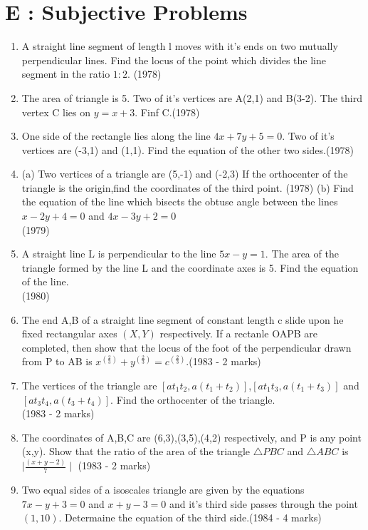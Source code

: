 \documentclass[12pt]{article}
\begin{document}
\section*{E  :  Subjective Problems}

\begin{enumerate}
\item  A straight line segment of length l moves with it's ends on two mutually perpendicular lines. Find the locus of the point which divides the line segment in the ratio $1:2$. (1978)
\item The area of triangle is 5. Two of it's vertices are A(2,1) and B(3-2). The third vertex C lies on $y=x+3$. Finf C.(1978)
\item One side of the rectangle lies along the line $4x+7y+5=0$. Two of it's vertices are (-3,1) and (1,1). Find the equation of the other two sides.(1978)
\item(a) Two vertices of a triangle are (5,-1) and (-2,3) If the orthocenter of the triangle is the origin,find the coordinates of the third point. (1978)
(b) Find the equation of the line which bisects the obtuse angle between the lines $x-2y+4=0$ and $4x-3y+2=0$\\ (1979)
\item  A straight line L is perpendicular to the line $5x-y=1$. The area of the triangle formed by the line L and the coordinate axes is 5. Find the equation of the line.\\ (1980)
\item The end A,B of a straight line segment of constant length c slide upon he fixed rectangular axes $(X,Y)$ respectively. If a rectanle OAPB are completed, then show that the locus of the foot of the perpendicular drawn from P to AB is $x^(\frac{2}{3})+y^(\frac{2}{3})=c^(\frac{2}{3})$.(1983 - 2 marks)\\
\item The vertices of the triangle are $[at_1t_2,a(t_1+t_2)]$,$[at_1t_3,a(t_1+t_3)]$ and $[at_3t_4,a(t_3+t_4)]$. Find the orthocenter of the triangle.\\ (1983 - 2 marks)
\item The coordinates of A,B,C are  (6,3),(3,5),(4,2) respectively, and P is any point (x,y). Show that the ratio of the area of the triangle $\triangle PBC$ and $\triangle ABC $ is $\mid\frac{(x+y-2)}{7}\mid$ (1983 - 2 marks)\\
\item Two equal sides of a isoscales triangle are given by the equations $7x-y+3=0$ and $x+y-3=0$ and it's third side passes through the point $(1,10)$. Determaine the equation of the third side.(1984 - 4 marks)\\

\end{enumerate}
\end{document}
